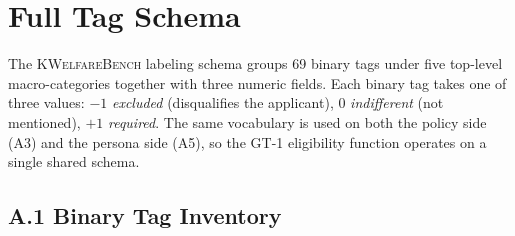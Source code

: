 \documentclass{article}
\newcommand{\kwbench}{\textsc{KWelfareBench}}
\newcommand{\ndim}{69}
\begin{document}
\clearpage



\clearpage
\appendix
\onecolumn

\section{Full Tag Schema}
\label{app:schema}

The \kwbench{} labeling schema groups \ndim{} binary tags under five
top-level macro-categories together with three numeric fields. Each
binary tag takes one of three values: $-1$ \emph{excluded}
(disqualifies the applicant), $0$ \emph{indifferent} (not mentioned),
$+1$ \emph{required}. The same vocabulary is used on both the policy
side (A3) and the persona side (A5), so the GT-1 eligibility function
operates on a single shared schema.

\subsection*{A.1 Binary Tag Inventory}
\end{document}
